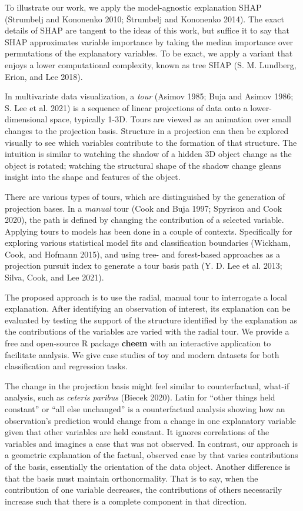 \documentclass[
  article]{article}
\begin{document}
To illustrate our work, we apply the model-agnostic explanation SHAP (Strumbelj and Kononenko 2010; Štrumbelj and Kononenko 2014). The exact details of SHAP are tangent to the ideas of this work, but suffice it to say that SHAP approximates variable importance by taking the median importance over permutations of the explanatory variables. To be exact, we apply a variant that enjoys a lower computational complexity, known as tree SHAP (S. M. Lundberg, Erion, and Lee 2018).

In multivariate data visualization, a \emph{tour} (Asimov 1985; Buja and Asimov 1986; S. Lee et al. 2021) is a sequence of linear projections of data onto a lower-dimensional space, typically 1-3D. Tours are viewed as an animation over small changes to the projection basis. Structure in a projection can then be explored visually to see which variables contribute to the formation of that structure. The intuition is similar to watching the shadow of a hidden 3D object change as the object is rotated; watching the structural shape of the shadow change gleans insight into the shape and features of the object.

There are various types of tours, which are distinguished by the generation of projection bases. In a \emph{manual} tour (Cook and Buja 1997; Spyrison and Cook 2020), the path is defined by changing the contribution of a selected variable. Applying tours to models has been done in a couple of contexts. Specifically for exploring various statistical model fits and classification boundaries (Wickham, Cook, and Hofmann 2015), and using tree- and forest-based approaches as a projection pursuit index to generate a tour basis path (Y. D. Lee et al. 2013; Silva, Cook, and Lee 2021).

The proposed approach is to use the radial, manual tour to interrogate a local explanation. After identifying an observation of interest, its explanation can be evaluated by testing the support of the structure identified by the explanation as the contributions of the variables are varied with the radial tour. We provide a free and open-source R package \textbf{cheem} with an interactive application to facilitate analysis. We give case studies of toy and modern datasets for both classification and regression tasks.

The change in the projection basis might feel similar to counterfactual, what-if analysis, such as \emph{ceteris paribus} (Biecek 2020). Latin for ``other things held constant'' or ``all else unchanged'' is a counterfactual analysis showing how an observation's prediction would change from a change in one explanatory variable given that other variables are held constant. It ignores correlations of the variables and imagines a case that was not observed. In contrast, our approach is a geometric explanation of the factual, observed case by that varies contributions of the basis, essentially the orientation of the data object. Another difference is that the basis must maintain orthonormality. That is to say, when the contribution of one variable decreases, the contributions of others necessarily increase such that there is a complete component in that direction.
\end{document}
